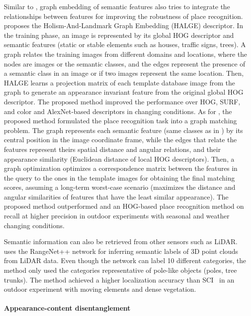 Similar to \cite{singh-et-al:2021:9564866}, graph embedding of semantic features also tries to integrate the relationships between features for improving the robustness of place recognition.
\cite{han-et-al:2018:2856274} proposes the Holism-And-Landmark Graph Embedding (HALGE) descriptor. In the training phase, an image is represented by its global HOG descriptor and semantic features (static or stable elements such as houses, traffic signs, trees).
A graph relates the training images from different domains and locations, where the nodes are images or the semantic classes, and the edges represent the presence of a semantic class in an image or if two images represent the same location.
Then, HALGE learns a projection matrix of each template database image from the graph to generate an appearance invariant feature from the original global HOG descriptor. The proposed method improved the performance over HOG, SURF, and color and AlexNet-based descriptors in changing conditions.
As for \cite{gao-zhang:2020:9196906}, the proposed method formulated the place recognition task into a graph matching problem. The graph represents each semantic feature (same classes as in \cite{singh-et-al:2021:9564866}) by its central position in the image coordinate frame, while the edges that relate the features represent theirs spatial distance and angular relations, and their appearance similarity (Euclidean distance of local HOG descriptors). Then, a graph optimization optimizes a correspondence matrix between the features in the query to the ones in the template images for obtaining the final matching scores, assuming a long-term worst-case scenario (maximizes the distance and angular similarities of features that have the least similar appearance).
The proposed method outperformed \cite{han-et-al:2018:3} and an HOG-based place recognition method on recall at higher precision in outdoor experiments with seasonal and weather changing conditions.

Semantic information can also be retrieved from other sensors such as LiDAR. \cite{wang-et-al:2021:9739599} uses the RangeNet++ network for inferring semantic labels of 3D point clouds from LiDAR data. Even though the network can label 10 different categories, the method only used the categories representative of pole-like objects (poles, tree trunks). The method achieved a higher localization accuracy than SCI~\parencite{kim-et-al:2019:2897340} in an outdoor experiment with moving elements and dense vegetation.


\paragraph{Appearance-content disentanglement}

